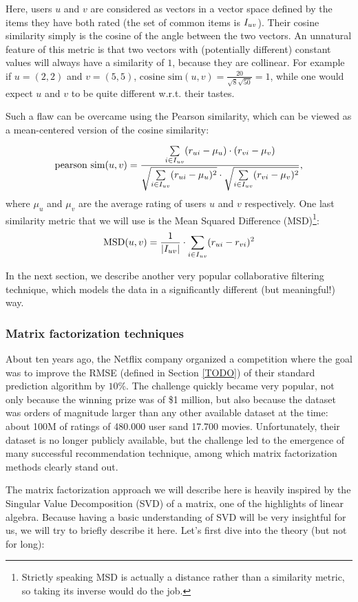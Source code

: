 Here, users $u$ and $v$ are considered as vectors in a vector space defined by
the items they have both rated (the set of common items is $I_{uv}$). Their cosine similarity simply is the cosine of
the angle between the two vectors. An unnatural feature of this metric is that
two vectors with (potentially different) constant values will always have a
similarity of $1$, because they are collinear. For example if $u = (2, 2)$ and
$v = (5, 5)$, $\text{cosine sim}(u, v) = \frac{20}{\sqrt{8}\sqrt{50}} = 1$,
while one would expect $u$ and $v$ to be quite different w.r.t. their tastes.

Such a flaw can be overcame using the Pearson similarity, which can be viewed as
a mean-centered version of the cosine similarity:

$$
\text{pearson sim}(u, v) = \frac{ \sum\limits_{i \in I_{uv}}
(r_{ui} -  \mu_u) \cdot (r_{vi} - \mu_{v})} {\sqrt{\sum\limits_{i
\in I_{uv}} (r_{ui} -  \mu_u)^2} \cdot \sqrt{\sum\limits_{i \in
I_{uv}} (r_{vi} -  \mu_{v})^2}},
$$
where $\mu_u$ and $\mu_v$ are the average rating of users $u$ and $v$
respectively.
One last similarity metric that we will use is the Mean Squared Difference
(MSD)\footnote{Strictly speaking MSD is actually a distance rather than a
similarity metric, so taking its inverse would do the job.}:
$$\text{MSD}(u, v) = \frac{1}{|I_{uv}|} \cdot \sum\limits_{i \in I_{uv}} (r_{ui} -
r_{vi})^2$$

In the next section, we describe another very popular collaborative filtering
technique, which models the data in a significantly different (but meaningful!)
way.

\subsubsection{Matrix factorization techniques}

About ten years ago, the Netflix company organized a competition where the goal
was to improve the RMSE (defined in Section \ref{TODO}) of their standard
prediction algorithm by $10\%$. The challenge quickly became very popular, not
only because the winning prize was of \$1 million, but also because the dataset
was orders of magnitude larger than any other available dataset at the time: about
100M of ratings of 480.000 user sand 17.700 movies. Unfortunately, their
dataset is no longer publicly available, but the challenge led to the emergence
of many successful recommendation technique, among which matrix factorization
methods clearly stand out.

The matrix factorization approach we will describe here is heavily inspired by
the Singular Value Decomposition (SVD) of a matrix, one of the highlights of
linear algebra. Because having a basic understanding of SVD will be very
insightful for us, we will try to briefly describe it here. Let's first dive
into the theory (but not for long):

